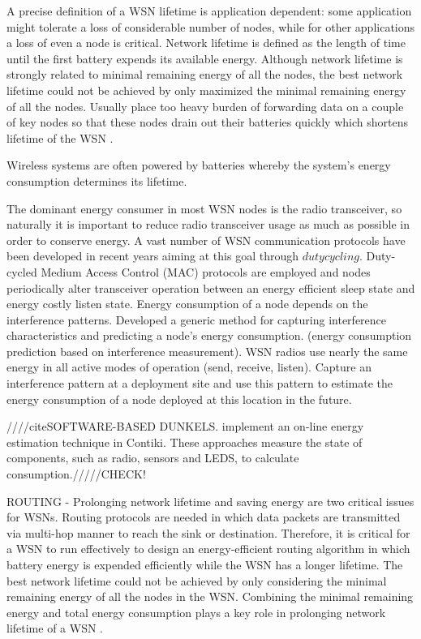 A precise definition of a WSN lifetime is application dependent: some application might tolerate a loss of considerable number of nodes, while for other applications a loss of even a node is critical. Network lifetime is defined as the length of time until the first battery expends its available energy. Although network lifetime is strongly related to minimal remaining energy of all the nodes, the best network lifetime could not be achieved by only maximized the minimal remaining energy of all the nodes. Usually place too heavy burden of forwarding data on a couple of key nodes so that these nodes drain out their batteries quickly which shortens lifetime of the WSN \cite{erapl}.

Wireless systems are often powered by batteries whereby the system's energy consumption determines its lifetime.

The dominant energy consumer in most WSN nodes is the radio transceiver, so naturally it is important to reduce radio transceiver usage as much as possible in order to conserve energy. A vast number of WSN communication protocols have been developed in recent years aiming at this goal through $duty cycling$. Duty-cycled Medium Access Control (MAC) protocols are employed and nodes periodically alter transceiver operation between an energy efficient sleep state and energy costly listen state. Energy consumption of a node depends on the interference patterns. Developed a generic method for capturing interference characteristics and predicting a node's energy consumption. (energy consumption prediction based on interference measurement). WSN radios use nearly the same energy in all active modes of operation (send, receive, listen). Capture an interference pattern at a deployment site and use this pattern to estimate the energy consumption of a node deployed at this location in the future. \cite{alexlifetime}

////citeSOFTWARE-BASED DUNKELS. implement an on-line energy estimation technique in Contiki. These approaches measure the state of components, such as radio, sensors and LEDS, to calculate consumption./////CHECK!

ROUTING - Prolonging network lifetime and saving energy are two critical issues for WSNs. Routing protocols are needed in which data packets are transmitted via multi-hop manner to reach the sink or destination. Therefore, it is critical for a WSN to run effectively to design an energy-efficient routing algorithm in which battery energy is expended efficiently while the WSN has a longer lifetime. The best network lifetime could not be achieved by only considering the minimal remaining energy of all the nodes in the WSN. Combining the minimal remaining energy and total energy consumption plays a key role in prolonging network lifetime of a WSN \cite{erapl}.

